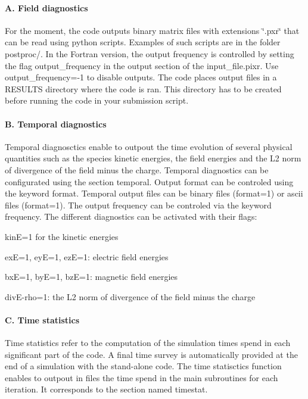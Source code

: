 \paragraph*{A. Field diagnostics}

For the moment, the code outputs binary matrix files with extensions \char`\"{}.\+pxr\char`\"{} that can be read using python scripts. Examples of such scripts are in the folder {\ttfamily postproc/}. In the Fortran version, the output frequency is controlled by setting the flag {\ttfamily output\+\_\+frequency} in the output section of the {\ttfamily input\+\_\+file.\+pixr}. Use {\ttfamily output\+\_\+frequency=-\/1} to disable outputs. The code places output files in a {\ttfamily R\+E\+S\+U\+L\+TS} directory where the code is ran. This directory has to be created before running the code in your submission script.

\paragraph*{B. Temporal diagnostics}

Temporal diagnosctics enable to outpout the time evolution of several physical quantities such as the species kinetic energies, the field energies and the L2 norm of divergence of the field minus the charge. Temporal diagnostics can be configurated using the section {\ttfamily temporal}. Output format can be controled using the keyword {\ttfamily format}. Temporal output files can be binary files ({\ttfamily format=1}) or ascii files ({\ttfamily format=1}). The output frequency can be controled via the keyword {\ttfamily frequency}. The different diagnostics can be activated with their flags\+:


\begin{DoxyItemize}
\item {\ttfamily kinE=1} for the kinetic energies
\item {\ttfamily exE=1}, {\ttfamily eyE=1}, {\ttfamily ezE=1}\+: electric field energies
\item {\ttfamily bxE=1}, {\ttfamily byE=1}, {\ttfamily bzE=1}\+: magnetic field energies
\item {\ttfamily div\+E-\/rho=1}\+: the L2 norm of divergence of the field minus the charge
\end{DoxyItemize}

\paragraph*{C. Time statistics}

Time statistics refer to the computation of the simulation times spend in each significant part of the code. A final time survey is automatically provided at the end of a simulation with the stand-\/alone code. The time statisctics function enables to outpout in files the time spend in the main subroutines for each iteration. It corresponds to the section named {\ttfamily timestat}. 